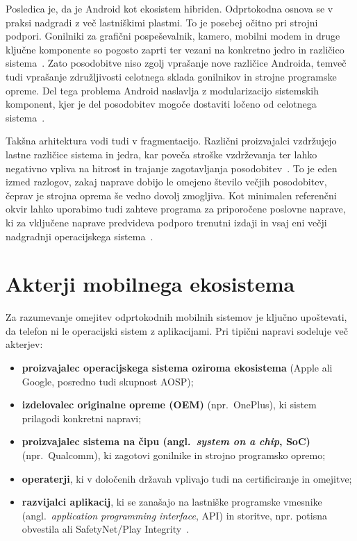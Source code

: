 \documentclass[a4paper,12pt,openright]{book}
\begin{document}
Posledica je, da je Android kot ekosistem hibriden.
Odprtokodna osnova se v praksi nadgradi z več lastniškimi plastmi.
To je posebej očitno pri strojni podpori.
Gonilniki za grafični pospeševalnik, kamero, mobilni modem in druge ključne komponente so pogosto zaprti ter vezani na konkretno jedro in različico sistema~\cite{android_treble_vendor_system_split,android_hidl_versioning_treble}.
Zato posodobitve niso zgolj vprašanje nove različice Androida, temveč tudi vprašanje združljivosti celotnega sklada gonilnikov in strojne programske opreme.
Del tega problema Android naslavlja z modularizacijo sistemskih komponent, kjer je del posodobitev mogoče dostaviti ločeno od celotnega sistema~\cite{android_mainline_modular_system}.

Takšna arhitektura vodi tudi v fragmentacijo.
Različni proizvajalci vzdržujejo lastne različice sistema in jedra, kar poveča stroške vzdrževanja ter lahko negativno vpliva na hitrost in trajanje zagotavljanja posodobitev~\cite{acar_android_security_updates_2024,android_devblog_treble_plus_one_2020}.
To je eden izmed razlogov, zakaj naprave dobijo le omejeno število večjih posodobitev, čeprav je strojna oprema še vedno dovolj zmogljiva.
Kot minimalen referenčni okvir lahko uporabimo tudi zahteve programa za priporočene poslovne naprave, ki za vključene naprave predvideva podporo trenutni izdaji in vsaj eni večji nadgradnji operacijskega sistema~\cite{android_enterprise_recommended_requirements}.

\section{Akterji mobilnega ekosistema}
\label{sec:akterji}

Za razumevanje omejitev odprtokodnih mobilnih sistemov je ključno upoštevati, da telefon ni le operacijski sistem z aplikacijami.
Pri tipični napravi sodeluje več akterjev:
\begin{itemize}
  \item \textbf{proizvajalec operacijskega sistema oziroma ekosistema} (Apple ali Google, posredno tudi skupnost AOSP);
  \item \textbf{izdelovalec originalne opreme (OEM)} (npr.~OnePlus), ki sistem prilagodi konkretni napravi;
  \item \textbf{proizvajalec sistema na čipu (angl.~\textit{system on a chip}, SoC)} (npr.~Qualcomm), ki zagotovi gonilnike in strojno programsko opremo;
  \item \textbf{operaterji}, ki v določenih državah vplivajo tudi na certificiranje in omejitve;
  \item \textbf{razvijalci aplikacij}, ki se zanašajo na lastniške programske vmesnike (angl.~\textit{application programming interface}, API) in storitve, npr. potisna obvestila ali SafetyNet/Play Integrity~\cite{safetynet_deprecated_replaced,play_integrity_overview}.
\end{itemize}
\end{document}
